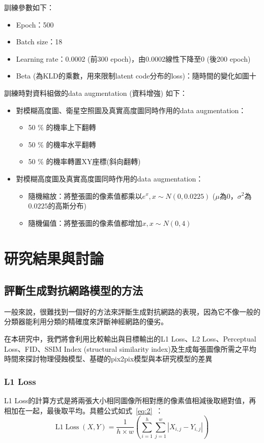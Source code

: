 \documentclass[a4paper, 12pt]{article}
\begin{document}
訓練參數如下：
\begin{itemize}
\item Epoch：500
\item Batch size：18
\item Learning rate：0.0002 (前300 epoch)，由0.0002線性下降至0 (後200 epoch)
\item Beta (為KLD的乘數，用來限制latent code分布的loss)：隨時間的變化如圖十
\end{itemize}
	
訓練時對資料組做的data augmentation (資料增強) 如下：
\begin{itemize}
\item 對模糊高度圖、衛星空照圖及真實高度圖同時作用的data augmentation：
	\begin{itemize}
		\item 50 \% 的機率上下翻轉
		\item 50 \% 的機率水平翻轉
		\item 50 \% 的機率轉置XY座標(斜向翻轉)
	\end{itemize}
	\item 對模糊高度圖及真實高度圖同時作用的data augmentation：
	\begin{itemize}
		\item 隨機縮放：將整張圖的像素值都乘以$e^x, x \sim N(0,0.0225)$ ($\mu$為0，$\sigma^2$為$0.0225$的高斯分布)
		\item 隨機偏值：將整張圖的像素值都增加$x, x\sim N(0,4)$
	\end{itemize}
\end{itemize}



\section{研究結果與討論}
\label{sec:res}
\subsection{評斷生成對抗網路模型的方法}
一般來說，很難找到一個好的方法來評斷生成對抗網路的表現，因為它不像一般的分類器能利用分類的精確度來評斷神經網路的優劣。

在本研究中，我們將會利用比較輸出與目標輸出的L1 Loss、L2 Loss、Perceptual Loss、FID、SSIM Index (structural similarity index)及生成每張圖像所需之平均時間來探討物理侵蝕模型、基礎的pix2pix模型與本研究模型的差異

\subsubsection{L1 Loss}
L1 Loss的計算方式是將兩張大小相同圖像所相對應的像素值相減後取絕對值，再相加在一起，最後取平均。具體公式如式~\ref{eq:2}~：
\begin{equation}
    \mathrm{L} 1 \operatorname{Loss}(X, Y)=\frac{1}{h \times w}\left(\sum_{i=1}^{h} \sum_{j=1}^{w}\left|X_{i, j}-Y_{i, j}\right|\right)
    \label{eq:2}
\end{equation}
\end{document}
